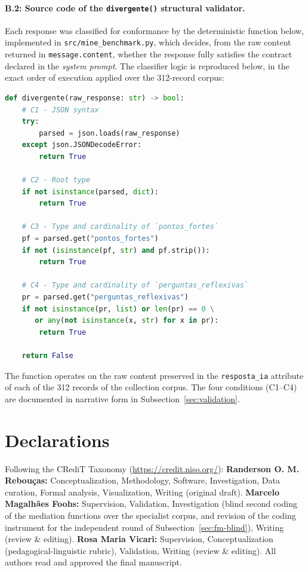 \documentclass{sbc2023}%
\begin{document}
\paragraph{B.2: Source code of the \texttt{divergente()} structural validator.} Each response was classified for conformance by the deterministic function below, implemented in \texttt{src/mine\_benchmark.py}, which decides, from the raw content returned in \texttt{message.content}, whether the response fully satisfies the contract declared in the \textit{system prompt}. The classifier logic is reproduced below, in the exact order of execution applied over the 312-record corpus:

\begin{lstlisting}[language=Python]
def divergente(raw_response: str) -> bool:
    # C1 - JSON syntax
    try:
        parsed = json.loads(raw_response)
    except json.JSONDecodeError:
        return True

    # C2 - Root type
    if not isinstance(parsed, dict):
        return True

    # C3 - Type and cardinality of `pontos_fortes`
    pf = parsed.get("pontos_fortes")
    if not (isinstance(pf, str) and pf.strip()):
        return True

    # C4 - Type and cardinality of `perguntas_reflexivas`
    pr = parsed.get("perguntas_reflexivas")
    if not isinstance(pr, list) or len(pr) == 0 \
       or any(not isinstance(x, str) for x in pr):
        return True

    return False
\end{lstlisting}

The function operates on the raw content preserved in the \texttt{resposta\_ia} attribute of each of the 312 records of the collection corpus. The four conditions (C1--C4) are documented in narrative form in Subsection~\ref{sec:validation}.


\section*{Declarations}

\begin{contributions}
Following the CRediT Taxonomy (\href{https://credit.niso.org/}{https://credit.niso.org/}): \textbf{Randerson O. M. Rebouças:} Conceptualization, Methodology, Software, Investigation, Data curation, Formal analysis, Visualization, Writing (original draft). \textbf{Marcelo Magalhães Foohs:} Supervision, Validation, Investigation (blind second coding of the mediation functions over the specialist corpus, and revision of the coding instrument for the independent round of Subsection~\ref{sec:fm-blind}), Writing (review \& editing). \textbf{Rosa Maria Vicari:} Supervision, Conceptualization (pedagogical-linguistic rubric), Validation, Writing (review \& editing). All authors read and approved the final manuscript.
\end{contributions}
\end{document}
